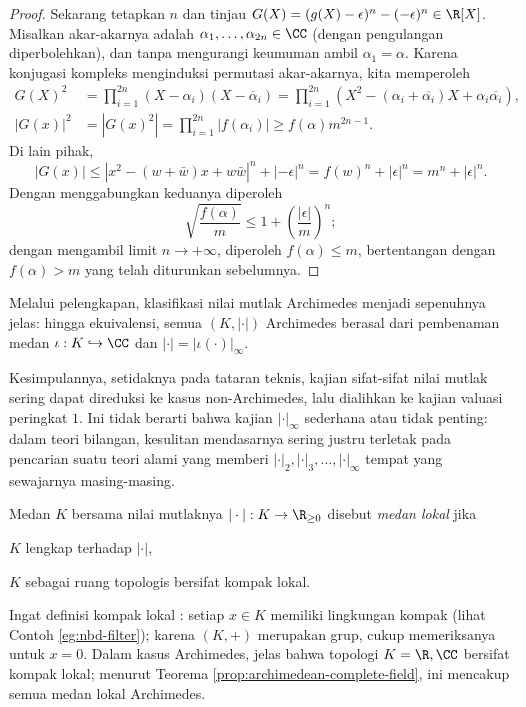 \begin{proof}
	Sekarang tetapkan $n$ dan tinjau $G(X) = (g(X)-\epsilon)^n - (-\epsilon)^n \in \R[X]$. Misalkan akar-akarnya adalah $\alpha_1, \ldots, \alpha_{2n} \in \CC$ (dengan pengulangan diperbolehkan), dan tanpa mengurangi keumuman ambil $\alpha_1 = \alpha$. Karena konjugasi kompleks menginduksi permutasi akar-akarnya, kita memperoleh
	\begin{align*}
		G(X)^2 & = \prod_{i=1}^{2n} (X - \alpha_i)(X - \overline{\alpha}_i) = \prod_{i=1}^{2n} \left( X^2 - (\alpha_i + \overline{\alpha_i})X + \alpha_i \overline{\alpha_i} \right), \\
		|G(x)|^2 & = |G(x)^2| = \prod_{i=1}^{2n} |f(\alpha_i)| \geq f(\alpha) m^{2n-1}.
	\end{align*}
	Di lain pihak,
	\[ |G(x)| \leq \left| x^2 - (w+\bar{w})x + w\bar{w} \right|^n + |-\epsilon|^n = f(w)^n + |\epsilon|^n = m^n + |\epsilon|^n. \]
	Dengan menggabungkan keduanya diperoleh
	\[ \sqrt{\frac{f(\alpha)}{m}} \leq 1 + \left(\frac{|\epsilon|}{m}\right)^n; \]
	dengan mengambil limit $n \to +\infty$, diperoleh $f(\alpha) \leq m$, bertentangan dengan $f(\alpha) > m$ yang telah diturunkan sebelumnya.
\end{proof}
Melalui pelengkapan, klasifikasi nilai mutlak Archimedes menjadi sepenuhnya jelas: hingga ekuivalensi, semua $(K, |\cdot|)$ Archimedes berasal dari pembenaman medan $\iota: K \hookrightarrow \CC$ dan $|\cdot| = |\iota(\cdot)|_\infty$.

Kesimpulannya, setidaknya pada tataran teknis, kajian sifat-sifat nilai mutlak sering dapat direduksi ke kasus non-Archimedes, lalu dialihkan ke kajian valuasi peringkat $1$. Ini tidak berarti bahwa kajian $|\cdot|_\infty$ sederhana atau tidak penting: dalam teori bilangan, kesulitan mendasarnya sering justru terletak pada pencarian suatu teori alami yang memberi $|\cdot|_2, |\cdot|_3, \ldots, |\cdot|_\infty$ tempat yang sewajarnya masing-masing.

\begin{definition}
	Medan $K$ bersama nilai mutlaknya $|\cdot|: K \to \R_{\geq 0}$ disebut \emph{medan lokal} jika
	\begin{inparaenum}[(a)]
		\item $K$ lengkap terhadap $|\cdot|$,
		\item $K$ sebagai ruang topologis bersifat kompak lokal.
	\end{inparaenum}
\end{definition}
Ingat definisi kompak lokal \cite[\S 7.6]{Xiong}: setiap $x \in K$ memiliki lingkungan kompak (lihat Contoh \ref{eg:nbd-filter}); karena $(K,+)$ merupakan grup, cukup memeriksanya untuk $x=0$. Dalam kasus Archimedes, jelas bahwa topologi $K=\R, \CC$ bersifat kompak lokal; menurut Teorema \ref{prop:archimedean-complete-field}, ini mencakup semua medan lokal Archimedes.

